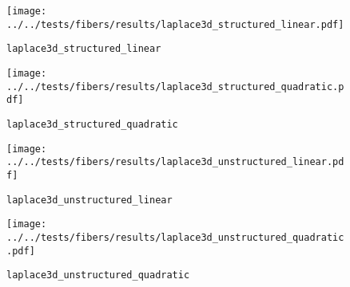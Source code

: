 %
\begin{frame}{}
  \vspace*{-0.2cm}
  \begin{figure}[h!]
    \centering%
    \texttt{[image: ../../tests/fibers/results/laplace3d\_structured\_linear.pdf]}%
    \caption{\lstinline{laplace3d_structured_linear}}
  \end{figure} 
\end{frame}
%
%
\begin{frame}{}
  \vspace*{-0.2cm}
  \begin{figure}[h!]
    \centering%
    \texttt{[image: ../../tests/fibers/results/laplace3d\_structured\_quadratic.pdf]}%
    \caption{\lstinline{laplace3d_structured_quadratic}}
  \end{figure} 
\end{frame}
%
%
\begin{frame}{}
  \vspace*{-0.2cm}
  \begin{figure}[h!]
    \centering%
    \texttt{[image: ../../tests/fibers/results/laplace3d\_unstructured\_linear.pdf]}%
    \caption{\lstinline{laplace3d_unstructured_linear}}
  \end{figure} 
\end{frame}
%
%
\begin{frame}{}
  \vspace*{-0.2cm}
  \begin{figure}[h!]
    \centering%
    \texttt{[image: ../../tests/fibers/results/laplace3d\_unstructured\_quadratic.pdf]}%
    \caption{\lstinline{laplace3d_unstructured_quadratic}}
  \end{figure} 
\end{frame}
%
